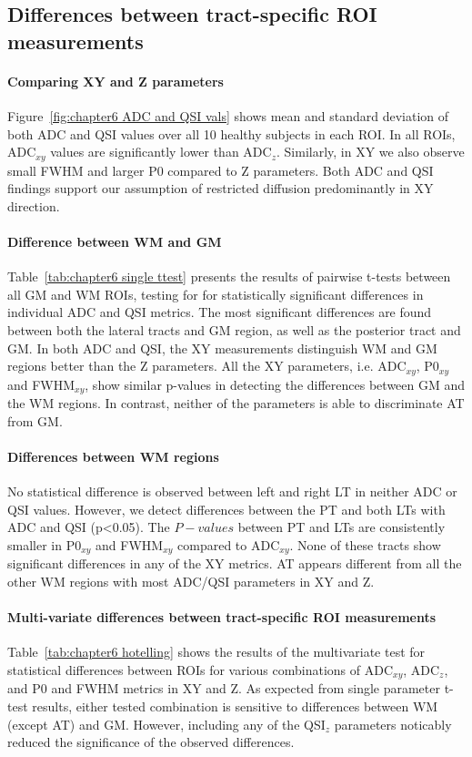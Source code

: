 \subsection{Differences between tract-specific ROI measurements}
\label{par:chapter6 tract specific}
\paragraph{Comparing XY and Z parameters }
Figure~\ref{fig:chapter6 ADC and QSI vals} shows mean and standard deviation of both \gls{ADC} and \gls{QSI} values over all 10 healthy subjects in each \gls{ROI}. In all ROIs, ADC$_{xy}$ values are significantly lower than ADC$_{z}$. Similarly, in XY we also observe small FWHM and larger P0 compared to Z parameters. Both ADC and QSI findings support our assumption of restricted diffusion predominantly in XY direction.

\paragraph{Difference between WM and GM }
Table~\ref{tab:chapter6 single ttest} presents the results of pairwise t-tests between all GM and WM \glspl{ROI}, testing for for statistically significant differences in individual ADC and QSI metrics. The most significant differences are found between both the lateral tracts and GM region, as well as the posterior tract and GM. In both ADC and QSI, the XY measurements distinguish WM and GM regions better than the Z parameters. All the XY parameters, i.e. ADC$_{xy}$, P0$_{xy}$ and FWHM$_{xy}$, show similar p-values in detecting the differences between GM and the WM regions. In contrast, neither of the parameters is able to discriminate AT from GM.

\paragraph{Differences between WM regions}
No statistical difference is observed between left and right LT in neither ADC or QSI values. However, we detect differences between the PT and both LTs with ADC and QSI (p<0.05). The $P-values$ between PT and LTs are consistently smaller in P0$_{xy}$ and FWHM$_{xy}$ compared to ADC$_{xy}$. None of these tracts show significant differences in any of the XY metrics. AT appears different from all the other WM regions with  most ADC/QSI parameters in XY and Z.

\paragraph*{Multi-variate differences between tract-specific ROI measurements }
Table~\ref{tab:chapter6 hotelling} shows the results of the multivariate test for statistical differences between \glspl{ROI} for various combinations of ADC$_{xy}$, ADC$_{z}$, and P0 and FWHM metrics in XY and Z. As expected from single parameter t-test results, either tested combination is sensitive to differences between WM (except AT) and GM. However, including any of the QSI$_z$ parameters noticably reduced the significance of the observed differences.

